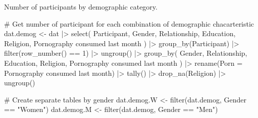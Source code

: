 \documentclass[
  bookmarksnumbered]{article}
\newenvironment{Shaded}{\begin{snugshade}}{\end{snugshade}}
\newcommand{\AttributeTok}[1]{\textcolor[rgb]{0.80,0.80,0.80}{#1}}
\newcommand{\CommentTok}[1]{\textcolor[rgb]{0.50,0.62,0.50}{#1}}
\newcommand{\DecValTok}[1]{\textcolor[rgb]{0.86,0.86,0.80}{#1}}
\newcommand{\FunctionTok}[1]{\textcolor[rgb]{0.94,0.94,0.56}{#1}}
\newcommand{\NormalTok}[1]{\textcolor[rgb]{0.80,0.80,0.80}{#1}}
\newcommand{\OtherTok}[1]{\textcolor[rgb]{0.94,0.94,0.56}{#1}}
\newcommand{\SpecialCharTok}[1]{\textcolor[rgb]{0.86,0.64,0.64}{#1}}
\newcommand{\StringTok}[1]{\textcolor[rgb]{0.80,0.58,0.58}{#1}}
\begin{document}
Number of participants by demographic category.

\begin{Shaded}
\begin{Highlighting}[]
\CommentTok{\# Get number of participant for each combination of demographic chacarteristic}
\NormalTok{dat.demog }\OtherTok{\textless{}{-}}\NormalTok{ dat }\SpecialCharTok{|\textgreater{}}
  \FunctionTok{select}\NormalTok{(}
\NormalTok{    Participant, Gender, Relationship, Education, Religion,}
    \StringTok{\textasciigrave{}}\AttributeTok{Pornography consumed last month}\StringTok{\textasciigrave{}}
\NormalTok{  ) }\SpecialCharTok{|\textgreater{}}
  \FunctionTok{group\_by}\NormalTok{(Participant) }\SpecialCharTok{|\textgreater{}}
  \FunctionTok{filter}\NormalTok{(}\FunctionTok{row\_number}\NormalTok{() }\SpecialCharTok{==} \DecValTok{1}\NormalTok{) }\SpecialCharTok{|\textgreater{}}
  \FunctionTok{ungroup}\NormalTok{() }\SpecialCharTok{|\textgreater{}}
  \FunctionTok{group\_by}\NormalTok{(}
\NormalTok{    Gender, Relationship, Education, Religion,}
    \StringTok{\textasciigrave{}}\AttributeTok{Pornography consumed last month}\StringTok{\textasciigrave{}}
\NormalTok{  ) }\SpecialCharTok{|\textgreater{}}
  \FunctionTok{rename}\NormalTok{(}\AttributeTok{Porn =} \StringTok{\textasciigrave{}}\AttributeTok{Pornography consumed last month}\StringTok{\textasciigrave{}}\NormalTok{) }\SpecialCharTok{|\textgreater{}}
  \FunctionTok{tally}\NormalTok{() }\SpecialCharTok{|\textgreater{}}
  \FunctionTok{drop\_na}\NormalTok{(Religion) }\SpecialCharTok{|\textgreater{}}
  \FunctionTok{ungroup}\NormalTok{()}

\CommentTok{\# Create separate tables by gender}
\NormalTok{dat.demog.W }\OtherTok{\textless{}{-}} \FunctionTok{filter}\NormalTok{(dat.demog, Gender }\SpecialCharTok{==} \StringTok{"Women"}\NormalTok{)}
\NormalTok{dat.demog.M }\OtherTok{\textless{}{-}} \FunctionTok{filter}\NormalTok{(dat.demog, Gender }\SpecialCharTok{==} \StringTok{"Men"}\NormalTok{)}


\end{Highlighting}
\end{Shaded}
\end{document}
